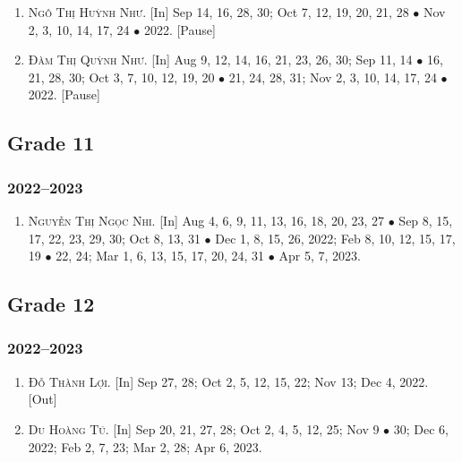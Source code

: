 \documentclass{article}
\begin{document}
\begin{enumerate}
	\item \textsc{Ngô Thị Huỳnh Như.} \textsf{[In]} Sep 14, 16, 28, 30; Oct 7, 12, 19, 20, 21, 28 $\bullet$ Nov 2, 3, 10, 14, 17, 24 $\bullet$ 2022. \textsf{[Pause]}
	\item \textsc{Đàm Thị Quỳnh Như.} \textsf{[In]} Aug 9, 12, 14, 16, 21, 23, 26, 30; Sep 11, 14 $\bullet$ 16, 21, 28, 30; Oct 3, 7, 10, 12, 19, 20 $\bullet$ 21, 24, 28, 31; Nov 2, 3, 10, 14, 17, 24 $\bullet$ 2022. \textsf{[Pause]}
\end{enumerate}

\subsection{Grade 11}

\subsubsection{2022--2023}

\begin{enumerate}
	\item \textsc{Nguyễn Thị Ngọc Nhi.} \textsf{[In]} Aug 4, 6, 9, 11, 13, 16, 18, 20, 23, 27 $\bullet$ Sep 8, 15, 17, 22, 23, 29, 30; Oct 8, 13, 31 $\bullet$ Dec 1, 8,  15, 26, 2022; Feb 8, 10, 12, 15, 17, 19 $\bullet$ 22, 24; Mar 1, 6, 13, 15, 17, 20, 24, 31 $\bullet$ Apr 5, 7, 2023.
\end{enumerate}

\subsection{Grade 12}

\subsubsection{2022--2023}

\begin{enumerate}
	\item \textsc{Đỗ Thành Lợi.} \textsf{[In]} Sep 27, 28; Oct 2, 5, 12, 15, 22; Nov 13; Dec 4, 2022. \textsf{[Out]}
	\item \textsc{Du Hoàng Tú.} \textsf{[In]} Sep 20, 21, 27, 28; Oct 2, 4, 5, 12, 25; Nov 9 $\bullet$ 30; Dec 6, 2022; Feb 2, 7, 23; Mar 2, 28; Apr 6, 2023.
\end{enumerate}

\end{document}
